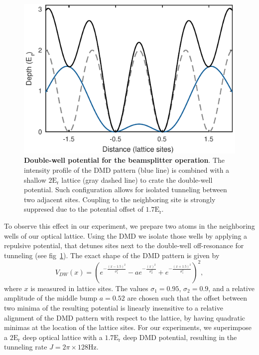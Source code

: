 \begin{figure}[t]
	\centering
	\includegraphics[scale=1]{figures/CBH_DW.pdf}
	\caption{{\bf Double-well potential for the beamsplitter operation}. The intensity profile of the DMD pattern (blue line) is combined with a shallow $2 \mathrm{E_r}$ lattice (gray dashed line) to crate the double-well potential. Such configuration allows for isolated tunneling between two adjacent sites. Coupling to the neighboring site is strongly suppresed due to the potential offset of $1.7 \mathrm{E_{r}}. $}
	\label{fig:CBH_DW}
\end{figure}

To observe this effect in our experiment, we prepare two atoms in the neighboring wells of our optical lattice. Using the DMD we isolate those wells by applying a repulsive potential, that detunes sites next to the double-well off-resonance for tunneling (see fig~\ref{fig:CBH_DW}). The exact shape of the DMD pattern is given by
\begin{equation}
V_{DW}(x) = (e^{-\frac{(x-1.5)^2}{\sigma_1^2}} - ae^{-\frac{(x)^2}{\sigma_2^2}} + e^{-\frac{(x+1.5)^2}{\sigma_1^2}})^2,
\end{equation}
where $x$ is measured in lattice sites. The values $\sigma_1 = 0.95$, $\sigma_2 = 0.9$, and a relative amplitude of the middle bump $a=0.52$ are chosen such that the offset between two minima of the resulting potential is linearly insensitive to a relative alignment of the DMD pattern with respect to the lattice, by having quadratic minimas at the location of the lattice sites. For our experiments, we superimpose a $2 \mathrm{E_r}$ deep optical lattice with a $1.7 \mathrm{E_r}$ deep DMD potential, resulting in the tunneling rate $J = 2 \pi \times 128 \mathrm{Hz}$.

